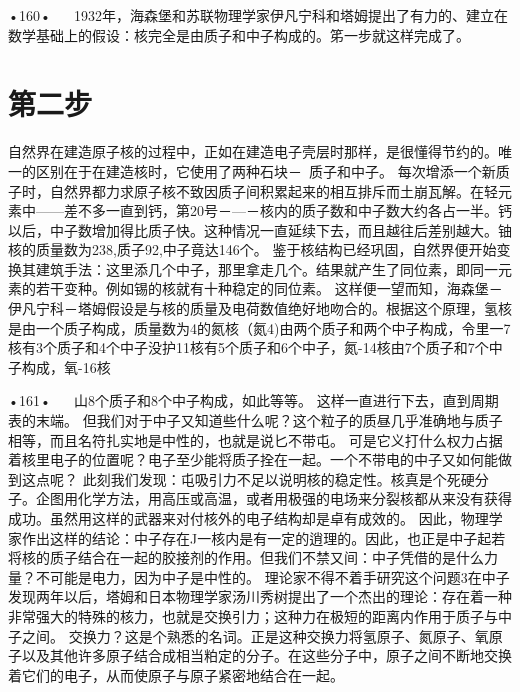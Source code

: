•160•
  
1932年，海森堡和苏联物理学家伊凡宁科和塔姆提出了有力的、建立在数学基础上的假设：核完全是由质子和中子构成的。笫一步就这样完成了。

\section{第二步}

自然界在建造原子核的过程中，正如在建造电子壳层时那样，是很懂得节约的。唯一的区别在于在建造核时，它使用了两种石块－~质子和中子。
每次增添一个新质子时，自然界都力求原子核不致因质子间积累起来的相互排斥而土崩瓦解。在轻元素中——差不多一直到钙，第20号－—－核内的质子数和中子数大约各占一半。钙以后，中子数增加得比质子快。这种情况一直延续下去，而且越往后差别越大。铀核的质量数为238,质子92,中子竟达146个。
鉴于核结构已经巩固，自然界便开始变换其建筑手法：这里添几个中子，那里拿走几个。结果就产生了同位素，即同一元素的若干变种。例如锡的核就有十种稳定的同位素。
这样便一望而知，海森堡－伊凡宁科－塔姆假设是与核的质量及电荷数值绝好地吻合的。根据这个原理，氢核是由一个质子构成，质量数为4的氮核（氮4)由两个质子和两个中子构成，令里一7核有3个质子和4个中子没护11核有5个质子和6个中子，氮-14核由7个质子和7个中子构成，氧-16核

•161•
  
山8个质子和8个中子构成，如此等等。
这样一直进行下去，直到周期表的末端。
但我们对于中子又知道些什么呢？这个粒子的质昼几乎准确地与质子相等，而且名符扎实地是中性的，也就是说匕不带屯。
可是它义打什么权力占据着核里电子的位置呢？电子至少能将质子拴在一起。一个不带电的中子又如何能做到这点呢？
此刻我们发现：屯吸引力不足以说明核的稳定性。核真是个死硬分子。企图用化学方法，用高压或高温，或者用极强的电场来分裂核都从来没有获得成功。虽然用这样的武器来对付核外的电子结构却是卓有成效的。
因此，物理学家作出这样的结论：中子存在J一核内是有一定的逍理的。因此，也正是中子起若将核的质子结合在一起的胶接剂的作用。但我们不禁又间：中子凭借的是什么力量？不可能是电力，因为中子是中性的。
理论家不得不着手研究这个问题3在中子发现两年以后，塔姆和日本物理学家汤川秀树提出了一个杰出的理论：存在着一种非常强大的特殊的核力，也就是交换引力；这种力在极短的距离内作用于质子与中子之间。
交换力？这是个熟悉的名词。正是这种交换力将氢原子、氮原子、氧原子以及其他许多原子结合成相当粕定的分子。在这些分子中，原子之间不断地交换着它们的电子，从而使原子与原子紧密地结合在一起。

